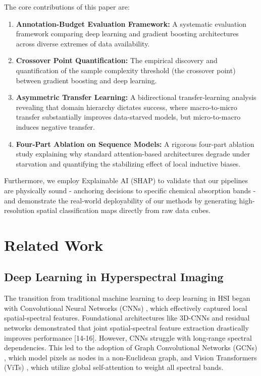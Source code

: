 \documentclass[pdflatex,sn-mathphys-num,iicol]{sn-jnl}
\begin{document}
The core contributions of this paper are:
\begin{enumerate}
    \item \textbf{Annotation-Budget Evaluation Framework:} A systematic evaluation framework comparing deep learning and gradient boosting architectures across diverse extremes of data availability.
    \item \textbf{Crossover Point Quantification:} The empirical discovery and quantification of the sample complexity threshold (the crossover point) between gradient boosting and deep learning.
    \item \textbf{Asymmetric Transfer Learning:} A bidirectional transfer-learning analysis revealing that domain hierarchy dictates success, where macro-to-micro transfer substantially improves data-starved models, but micro-to-macro induces negative transfer.
    \item \textbf{Four-Part Ablation on Sequence Models:} A rigorous four-part ablation study explaining why standard attention-based architectures degrade under starvation and quantifying the stabilizing effect of local inductive biases.
\end{enumerate}

Furthermore, we employ Explainable AI (SHAP) to validate that our pipelines are physically sound - anchoring decisions to specific chemical absorption bands - and demonstrate the real-world deployability of our methods by generating high-resolution spatial classification maps directly from raw data cubes.

\section{Related Work}\label{sec:related}

\subsection{Deep Learning in Hyperspectral Imaging}
The transition from traditional machine learning \cite{b27, b28} to deep learning in HSI began with Convolutional Neural Networks (CNNs) \cite{b29, b30}, which effectively captured local spatial-spectral features. Foundational architectures like 3D-CNNs and residual networks demonstrated that joint spatial-spectral feature extraction drastically improves performance [14-16]. However, CNNs struggle with long-range spectral dependencies. This led to the adoption of Graph Convolutional Networks (GCNs) \cite{b2}, which model pixels as nodes in a non-Euclidean graph, and Vision Transformers (ViTs) \cite{b3, b10}, which utilize global self-attention to weight all spectral bands. 
\end{document}
